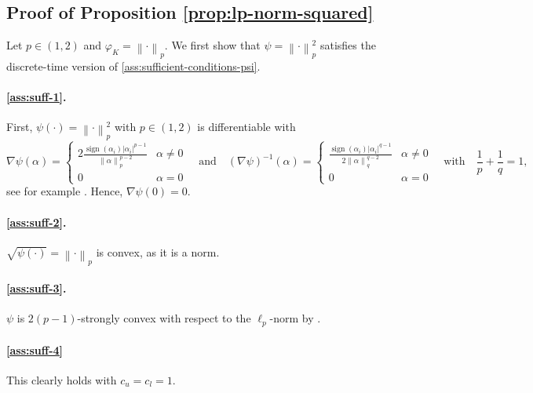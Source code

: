 \documentclass[a4paper]{article}
\newcommand{\pr}[1]{\left(#1\right)}
\newcommand{\abs}[1]{\left\lvert#1\right\rvert}
\newcommand{\norm}[1]{\left\|#1\right\|}
\DeclareMathOperator{\signOp}{sign}
\newcommand{\sign}[1]{\signOp\pr{#1}}
\theoremstyle{thmstyle}
\theoremstyle{defstyle}
\theoremstyle{remark}
\begin{document}
\subsection{Proof of Proposition \ref{prop:lp-norm-squared}}
\label{subsec:proof-lp-norm-squared}

    Let $p\in(1,2)$ and $\varphi_K=\norm{\cdot}_p$. We first show that $\psi=\norm{\cdot}_p^2$ satisfies the discrete-time version of \cref{ass:sufficient-conditions-psi}.

    \paragraph{\ref{ass:suff-1}.} First, $\psi(\cdot)=\norm{\cdot}_p^2$ with $p\in(1,2)$ is differentiable \citep[Lemma 17][Example 3.2]{Shalev2007online,Juditsky2008large} with 
    \begin{equation*}
         \nabla \psi(\alpha)= 
         \begin{cases}
             2\frac{\sign{\alpha_i}\abs{\alpha_i}^{p-1}}{\norm{\alpha}_p^{p-2}} & \alpha \neq 0 \\
             0 & \alpha = 0
         \end{cases}       
         \quad \text{and} \quad 
         (\nabla \psi)^{-1}(\alpha)= 
         \begin{cases}
             \frac{\sign{\alpha_i}\abs{\alpha_i}^{q-1}}{2\norm{\alpha}_q^{q-2}} & \alpha \neq 0 \\
             0 & \alpha = 0
         \end{cases} 
         \quad \text{with} \quad \frac{1}{p}+\frac{1}{q}=1,
    \end{equation*}
    see for example \cite[Lemma 1]{Gentile2003}. Hence, $\nabla \psi(0)=0$.

    \paragraph{\ref{ass:suff-2}.} $\sqrt{\psi(\cdot)}=\norm{\cdot}_p$ is convex, as it is a norm.
    
    \paragraph{\ref{ass:suff-3}.} $\psi$ is $2(p-1)$-strongly convex with respect to the $\ell_p$-norm by \cite[Lemma 17]{Shalev2007online}.

    \paragraph{\ref{ass:suff-4}} This clearly holds with $c_u=c_l=1$.
\end{document}
